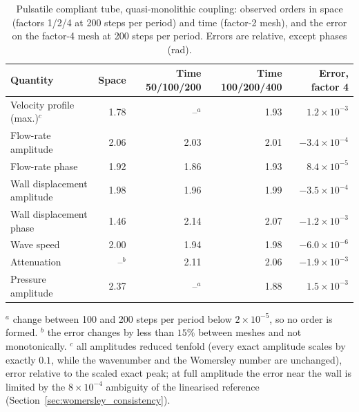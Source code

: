 \begin{table}[htbp]
	\centering
	\small
	\setlength{\tabcolsep}{4pt}
	\caption{Pulsatile compliant tube, quasi-monolithic coupling: observed orders in space (factors 1/2/4 at 200 steps per period) and time (factor-2 mesh), and the error on the factor-4 mesh at 200 steps per period. Errors are relative, except phases (rad).}
	\label{tab:womersley_m}
	\begin{tabular}{lrrrr}
		\toprule
		Quantity & Space & Time 50/100/200 & Time 100/200/400 & Error, factor 4 \\
		\midrule
		Velocity profile (max.)$^{c}$ & 1.78 & --$^{a}$ & 1.93 & $1.2\times10^{-3}$ \\
		Flow-rate amplitude & 2.06 & 2.03 & 2.01 & $-3.4\times10^{-4}$ \\
		Flow-rate phase & 1.92 & 1.86 & 1.93 & $8.4\times10^{-5}$ \\
		Wall displacement amplitude & 1.98 & 1.96 & 1.99 & $-3.5\times10^{-4}$ \\
		Wall displacement phase & 1.46 & 2.14 & 2.07 & $-1.2\times10^{-3}$ \\
		Wave speed & 2.00 & 1.94 & 1.98 & $-6.0\times10^{-6}$ \\
		Attenuation & --$^{b}$ & 2.11 & 2.06 & $-1.9\times10^{-3}$ \\
		Pressure amplitude & 2.37 & --$^{a}$ & 1.88 & $1.5\times10^{-3}$ \\
		\bottomrule
	\end{tabular}

	\smallskip
	{\footnotesize $^{a}$ change between 100 and 200 steps per period below $2\times10^{-5}$, so no order is formed. $^{b}$ the error changes by less than $15\%$ between meshes and not monotonically. $^{c}$ all amplitudes reduced tenfold (every exact amplitude scales by exactly $0.1$, while the wavenumber and the Womersley number are unchanged), error relative to the scaled exact peak; at full amplitude the error near the wall is limited by the $8\times10^{-4}$ ambiguity of the linearised reference (Section~\ref{sec:womersley_consistency}).}
\end{table}

